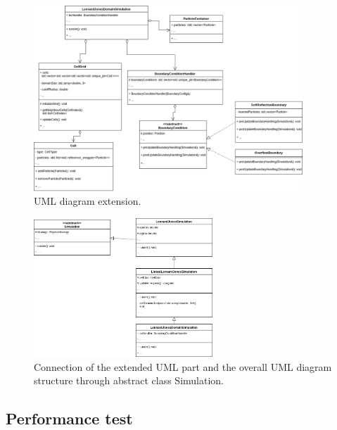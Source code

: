 \documentclass{article}
\begin{document}
\begin{figure}[H]
    \centering
    \includegraphics[width=0.9\textwidth]{res/UML3.drawio}
    \caption{UML diagram extension.}
    \label{fig:uml}
\end{figure}

\begin{figure}[H]
    \centering
    \includegraphics[width=0.6\textwidth]{res/UMLSimulation3.drawio}
    \caption{Connection of the extended UML part and the overall UML diagram structure through abstract class Simulation.}
    \label{fig:uml2}
\end{figure}

\subsection{Performance test}
\label{subsec:perflc}
\end{document}
